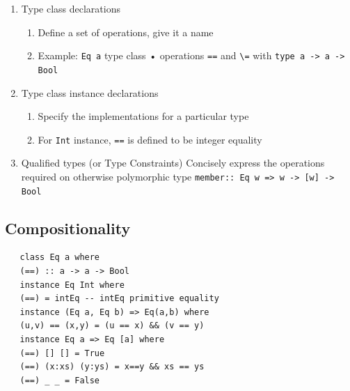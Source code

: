 \begin{enumerate}
   \item Type class declarations
   \begin{enumerate}
      \item Define a set of operations, give it a name
      \item Example: \lstinline|Eq a| type class
      • operations \lstinline|==| and \lstinline|\=| with \lstinline|type a -> a -> Bool|
   \end{enumerate}
   \item Type class instance declarations
   \begin{enumerate}
      \item Specify the implementations for a particular type
      \item For \lstinline|Int| instance, \lstinline|==| is defined to be integer equality
   \end{enumerate}
   \item Qualified types (or Type Constraints)
   Concisely express the operations required on otherwise polymorphic type
   \lstinline|member:: Eq w => w -> [w] -> Bool|
\end{enumerate}


\subsection{Compositionality}
\begin{lstlisting}
   class Eq a where
   (==) :: a -> a -> Bool
   instance Eq Int where
   (==) = intEq -- intEq primitive equality
   instance (Eq a, Eq b) => Eq(a,b) where
   (u,v) == (x,y) = (u == x) && (v == y)
   instance Eq a => Eq [a] where
   (==) [] [] = True
   (==) (x:xs) (y:ys) = x==y && xs == ys
   (==) _ _ = False
\end{lstlisting}

